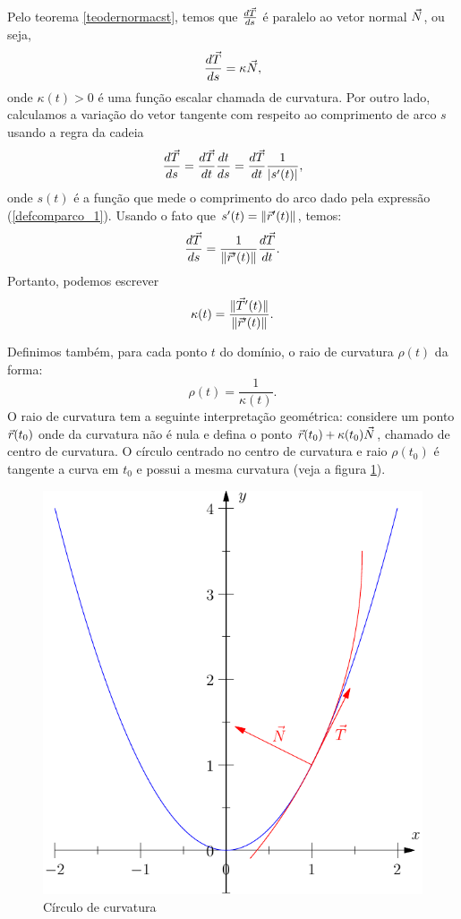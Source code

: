 Pelo teorema \ref{teodernormacst}, temos que $\frac{d \vec{T} }{ds}$ é paralelo ao vetor normal $\vec{N}$, ou seja,
\begin{equation}{\label{Frenet_1}}
\frac{d \vec{T} }{ds}=\kappa   \vec{N},
\end{equation}
onde $\kappa(t)>0$ é uma função escalar chamada de curvatura. Por outro lado, calculamos a variação do vetor tangente com respeito ao comprimento de arco $s$ usando a regra da cadeia
$$
\frac{d \vec{T} }{ds}=\frac{d \vec{T} }{dt}\frac{dt}{ds}=\frac{d \vec{T} }{dt}\frac{1}{|s'(t)|},
$$
onde $s(t)$ é a função que mede o comprimento do arco dado pela expressão (\ref{defcomparco_1}). Usando o fato que $s'(t)=\|\vec{r}'(t)\|$, temos:
$$
\frac{d \vec{T} }{ds}=\frac{1}{\|\vec{r}'(t)\|}\frac{d \vec{T} }{dt}.
$$
Portanto, podemos escrever
$$
\kappa(t)=\frac{\|\vec{T}'(t)\|}{\|\vec{r}'(t)\|}.
$$

Definimos também, para cada ponto $t$ do domínio, o raio de curvatura $\rho(t)$ da forma:
$$
\rho(t)=\frac{1}{\kappa(t)}.
$$
O raio de curvatura tem a seguinte interpretação geométrica: considere um ponto $\vec{r}(t_0)$ onde da curvatura não é nula e defina o ponto $\vec{r}(t_0)+\kappa(t_0)\vec{N}$, chamado de centro de curvatura. O círculo centrado no centro de curvatura e raio $\rho(t_0)$ é tangente a curva em $t_0$ e possui a mesma curvatura (veja a figura \ref{raio_de_curvatura}).


\begin{figure}
\begin{center}
    \includegraphics{./cap_curvas/pics/circulo_curvatura_parabola}
 \caption{Círculo de curvatura}\label{raio_de_curvatura}
  \end{center}
\end{figure}

